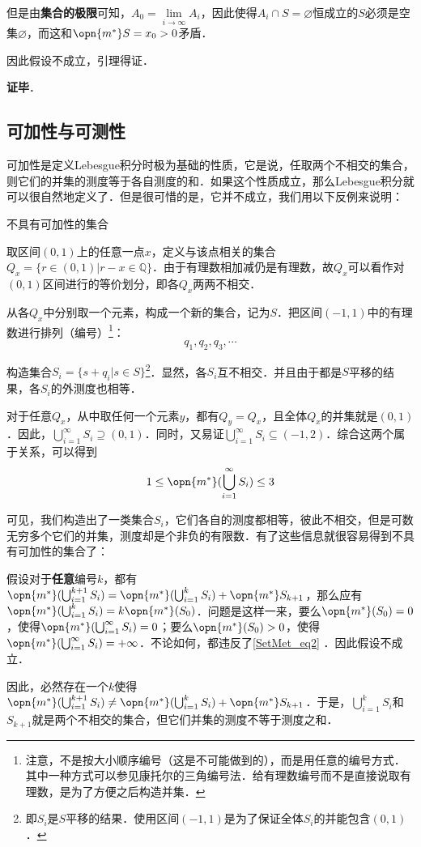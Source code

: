 但是由\textbf{集合的极限}可知，$A_0=\lim\limits_{i\to\infty} A_i$，因此使得$A_i\cap S=\varnothing$恒成立的$S$必须是空集$\varnothing$，而这和$\opn{m^*}S=x_0>0$矛盾．

因此假设不成立，引理得证．

\textbf{证毕}．






\subsection{可加性与可测性}

可加性是定义Lebesgue积分时极为基础的性质，它是说，任取两个不相交的集合，则它们的并集的测度等于各自测度的和．如果这个性质成立，那么Lebesgue积分就可以很自然地定义了．但是很可惜的是，它并不成立，我们用以下反例来说明：

\begin{example}{不具有可加性的集合}\label{SetMet_ex1}

取区间$(0, 1)$上的任意一点$x$，定义与该点相关的集合$Q_x=\{r\in(0, 1)|r-x\in\mathbb{Q}\}$．由于有理数相加减仍是有理数，故$Q_x$可以看作对$(0, 1)$区间进行的等价划分，即各$Q_x$两两不相交．

从各$Q_x$中分别取一个元素，构成一个新的集合，记为$S$．把区间$(-1, 1)$中的有理数进行排列（编号）\footnote{注意，不是按大小顺序编号（这是不可能做到的），而是用任意的编号方式．其中一种方式可以参见康托尔的三角编号法．给有理数编号而不是直接说取有理数，是为了方便之后构造并集．}：
\begin{equation}
q_1, q_2, q_3, \cdots 
\end{equation}

构造集合$S_i=\{s+q_i|s\in S\}$\footnote{即$S_i$是$S$平移的结果．使用区间$(-1, 1)$是为了保证全体$S_i$的并能包含$(0, 1)$．}．显然，各$S_i$互不相交．并且由于都是$S$平移的结果，各$S_i$的外测度也相等．

对于任意$Q_x$，从中取任何一个元素$y$，都有$Q_y=Q_x$，且全体$Q_x$的并集就是$(0, 1)$．因此，$\bigcup_{i=1}^\infty S_i\supseteq (0, 1)$．同时，又易证$\bigcup_{i=1}^\infty S_i\subseteq (-1, 2)$．综合这两个属于关系，可以得到
\begin{equation}\label{SetMet_eq2}
1\leq\opn{m^*}(\bigcup_{i=1}^\infty S_i)\leq 3
\end{equation}

可见，我们构造出了一类集合$S_i$，它们各自的测度都相等，彼此不相交，但是可数无穷多个它们的并集，测度却是个非负的有限数．有了这些信息就很容易得到不具有可加性的集合了：

假设对于\textbf{任意}编号$k$，都有$\opn{m^*}(\bigcup_{i=1}^{k+1} S_i)=\opn{m^*}(\bigcup_{i=1}^k S_i)+\opn{m^*}S_{k+1}$，那么应有$\opn{m^*}(\bigcup_{i=1}^{k} S_i)=k\opn{m^*}(S_0)$．问题是这样一来，要么$\opn{m^*}(S_0)=0$，使得$\opn{m^*}(\bigcup_{i=1}^\infty S_i)=0$；要么$\opn{m^*}(S_0)>0$，使得$\opn{m^*}(\bigcup_{i=1}^\infty S_i)=+\infty$．不论如何，都违反了\autoref{SetMet_eq2} ．因此假设不成立．

因此，必然存在一个$k$使得$\opn{m^*}(\bigcup_{i=1}^{k+1} S_i) \neq \opn{m^*}(\bigcup_{i=1}^k S_i)+\opn{m^*}S_{k+1}$．于是，$\bigcup_{i=1}^k S_i$和$S_{k+1}$就是两个不相交的集合，但它们并集的测度不等于测度之和．


\end{example}

